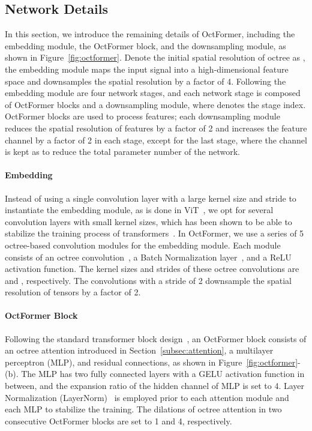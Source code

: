 \documentclass[acmtog,screen,authorversion]{acmart}
\begin{document}
\subsection{Network Details}  \label{subsec:network}
In this section, we introduce the remaining details of OctFormer, including the embedding module, the OctFormer block, and the downsampling module, as shown in Figure~\ref{fig:octformer}.
Denote the initial spatial resolution of octree as , the embedding module maps the input signal into a high-dimensional feature space and downsamples the spatial resolution by a factor of 4.
Following the embedding module are four network stages, and each network stage is composed of  OctFormer blocks and a downsampling module, where  denotes the stage index.
OctFormer blocks are used to process features; each downsampling module reduces the spatial resolution of features by a factor of 2 and increases the feature channel by a factor of 2 in each stage, except for the last stage, where the channel is kept as  to reduce the total parameter number of the network.


\paragraph{Embedding}
Instead of using a single convolution layer with a large kernel size and stride to instantiate the embedding module, as is done in ViT~\cite{Dosovitskiy2021}, we opt for several convolution layers with small kernel sizes, which has been shown to be able to stabilize the training process of transformers~\cite{Xiao2021}.
In OctFormer, we use a series of 5 octree-based convolution modules for the embedding module.
Each module consists of an octree convolution~\cite{Wang2017}, a Batch Normalization layer~\cite{Loffe2015}, and a ReLU activation function.
The kernel sizes and strides of these octree convolutions are  and , respectively.
The convolutions with a stride of 2 downsample the spatial resolution of tensors by a factor of 2.


\paragraph{OctFormer Block}
Following the standard transformer block design~\cite{Vaswani2017}, an OctFormer block consists of an octree attention introduced in Section~\ref{subsec:attention}, a multilayer perceptron (MLP), and residual connections, as shown in Figure~\ref{fig:octformer}-(b).
The MLP has two fully connected layers with a GELU activation function in between, and the expansion ratio of the hidden channel of MLP is set to 4.
Layer Normalization (LayerNorm)~\cite{Ba2016} is employed prior to each attention module and each MLP to stabilize the training.
The dilations of octree attention in two consecutive OctFormer blocks are set to 1 and 4, respectively.
\end{document}
